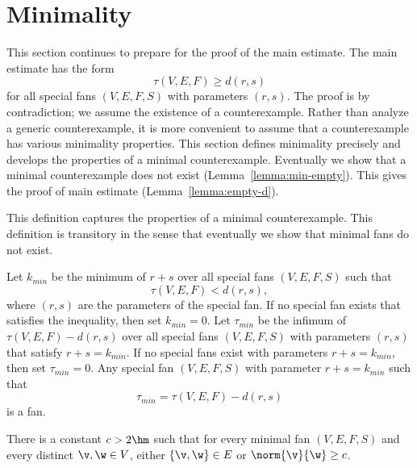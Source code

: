 \section{Minimality}


This section continues to prepare for the proof of the main estimate.
The main estimate has the form
\[
\tau(V,E,F) \ge d(r,s)
\]
for all special fans $(V,E,F,S)$ with parameters $(r,s)$.  The proof
is by contradiction; we assume the existence of a counterexample.
Rather than analyze a generic counterexample, it is more convenient to
assume that a counterexample has various minimality properties.  This
section defines minimality precisely and develops the properties of a
minimal counterexample.  Eventually we show that a minimal
counterexample does not exist (Lemma~\ref{lemma:min-empty}).  This
gives the proof of main estimate (Lemma~\ref{lemma:empty-d}).


This definition captures the properties of a minimal counterexample.
This definition is transitory in the sense that eventually we show
that minimal fans do not exist.

\begin{definition}
Let $k_{min}$ be the minimum of $r+s$ over
all special fans $(V,E,F,S)$ such that 
\begin{equation}\label{eqn:kmin}
\tau(V,E,F) < d (r,s),
\end{equation}
where $(r,s)$ are the parameters of the special fan.  If no special
fan exists that satisfies the inequality, then set $k_{min}=0$.  Let
$\tau_{min}$ be the infimum of $\tau(V,E,F)-d(r,s)$ over all special
fans $(V,E,F,S)$ with parameters $(r,s)$ that satisfy $r+s=k_{min}$.  If
no special fans exist with parameters $r+s=k_{min}$, then set
$\tau_{min}=0$.  Any special fan $(V,E,F,S)$ with parameter
$r+s=k_{min}$ such that
\[ 
\tau_{min}= \tau(V,E,F)-d(r,s)
\] 
is a  fan.
\end{definition}


\begin{lemma}[]\label{lemma:c-bound}
There is a constant $c>2\hm$ such that for every minimal fan
$(V,E,F,S)$ and every distinct $\v,\w\in V$, either $\{\v,\w\}\in E$
or $\norm{\v}{\w}\ge c$.
\end{lemma}


